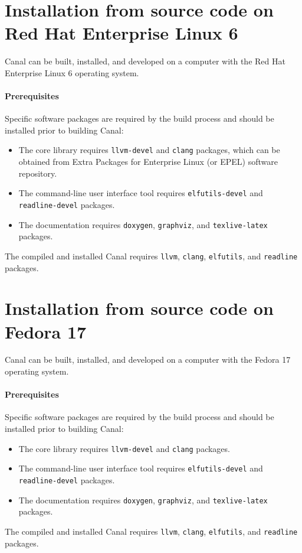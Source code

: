 \documentclass[a4paper]{book}
\begin{document}

\section{Installation from source code on Red Hat Enterprise Linux 6}

Canal can be built, installed, and developed on a computer with the
Red Hat Enterprise Linux 6 operating system.

\paragraph*{Prerequisites}
Specific software packages are required by the build process and
should be installed prior to building Canal:
\begin{itemize}
\item The core library requires \texttt{llvm-devel} and \texttt{clang}
  packages, which can be obtained from Extra Packages for Enterprise
  Linux (or EPEL) software repository.
\item The command-line user interface tool requires
  \texttt{elfutils-devel} and \texttt{readline-devel} packages.
\item The documentation requires \texttt{doxygen}, \texttt{graphviz},
  and \texttt{texlive-latex} packages.
\end{itemize}
The compiled and installed Canal requires \texttt{llvm},
\texttt{clang}, \texttt{elfutils}, and \texttt{readline} packages.

\section{Installation from source code on Fedora 17}

Canal can be built, installed, and developed on a computer with the
Fedora 17 operating system.

\paragraph*{Prerequisites}
Specific software packages are required by the build process and
should be installed prior to building Canal:
\begin{itemize}
\item The core library requires \texttt{llvm-devel} and \texttt{clang}
  packages.
\item The command-line user interface tool requires
  \texttt{elfutils-devel} and \texttt{readline-devel} packages.
\item The documentation requires \texttt{doxygen}, \texttt{graphviz},
  and \texttt{texlive-latex} packages.
\end{itemize}
The compiled and installed Canal requires \texttt{llvm},
\texttt{clang}, \texttt{elfutils}, and \texttt{readline} packages.
\end{document}
